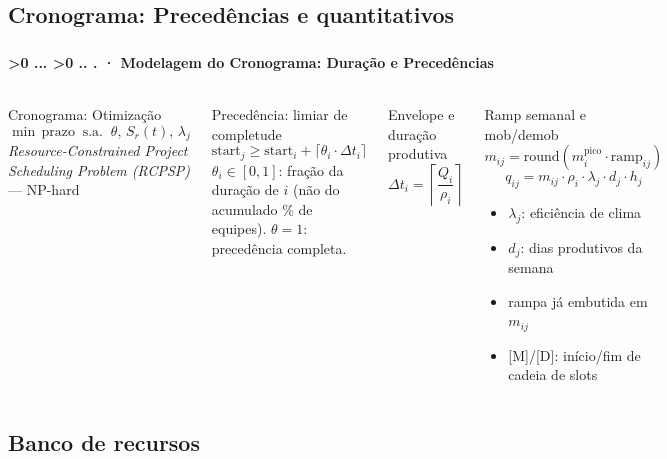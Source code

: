 \documentclass[aspectratio=169,10pt]{beamer}
\newcounter{mlc3}[subsection]
\newcounter{mlc4}[mlc3]
\newcommand{\pathnum}{%
  \ifnum\value{mlc4}>0
    \thesection.\thesubsection.\arabic{mlc3}.\arabic{mlc4}%
  \else\ifnum\value{mlc3}>0
    \thesection.\thesubsection.\arabic{mlc3}%
  \else
    \thesection.\thesubsection%
  \fi\fi
}
\newcommand{\mtitle}[1]{%
  \frametitle{\insertsection}%
  \framesubtitle{\pathnum\;·\; #1}}
\begin{document}
\subsection{Cronograma: Precedências e quantitativos}
\begin{frame}
  \mtitle{Modelagem do Cronograma: Duração e Precedências}
  \begin{columns}[T]
    \begin{exampleblock}{\small Cronograma: Otimização}
      \scriptsize
      \[
        \min\,\text{prazo} \;\;\text{s.a.}\;\; \theta,\, S_r(t),\, \lambda_j
      \]
      \emph{Resource-Constrained Project Scheduling Problem (RCPSP)} --- NP-hard
    \end{exampleblock}
    \vspace{4pt}
    \begin{block}{Precedência: limiar de completude}
      \[
        \text{start}_j \geq \text{start}_i + \lceil \theta_i \cdot \Delta t_i \rceil
      \]
      \scriptsize $\theta_i \in [0,1]$: fração da duração de $i$ (não do
      acumulado \% de equipes). $\theta=1$: precedência completa.
    \end{block}
    \begin{block}{Envelope e duração produtiva}
      \[
        \Delta t_i = \left\lceil \frac{Q_i}{\rho_i} \right\rceil
      \]
    \end{block}
    \vspace{4pt}
    \begin{block}{Ramp semanal e mob/demob}
      \[
        m_{ij} = \text{round}(m_i^{\text{pico}} \cdot \text{ramp}_{ij})
      \]
      \[
        q_{ij} = m_{ij} \cdot \rho_i \cdot \lambda_j \cdot d_j \cdot h_j
      \]
      \begin{itemize}\scriptsize
        \item $\lambda_j$: eficiência de clima
        \item $d_j$: dias produtivos da semana
        \item rampa já embutida em $m_{ij}$
        \item {[M]/[D]}: início/fim de cadeia de slots
      \end{itemize}
    \end{block}
  \end{columns}
\end{frame}

\subsection{Banco de recursos}
\end{document}
